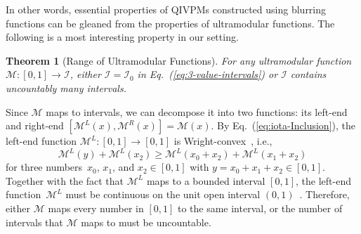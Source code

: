 \documentclass[english,reprint, aps, prl,superscriptaddress, showpacs,
showkeys, longbibliography, amsmath, amssymb, floatfix]{revtex4-1}
\theoremstyle{plain}
\newtheorem{thm}{Theorem}
\theoremstyle{definition}
\newcommand{\ultramodular}{\mathcal{M}}
\newcommand{\ultramodularL}[1][]{\ensuremath{\ultramodular^{L{#1}}}}
\newcommand{\ultramodularR}[1][]{\ensuremath{\ultramodular^{R{#1}}}}
\begin{document}
In other words, essential properties of QIVPMs constructed using
blurring functions can be gleaned from the properties of
ultramodular functions. The following is a most interesting property
in our setting. 

\begin{thm}[Range of Ultramodular Functions]\label{thm:convex-uncountable}For
any ultramodular function~$\ultramodular:\left[0,1\right]\rightarrow\mathscr{I}$,
either $\mathscr{I}=\mathscr{I}_{0}$ in Eq.~(\ref{eq:3-value-intervals}) or
$\mathscr{I}$ contains uncountably many intervals.\end{thm}

Since $\ultramodular$ maps to intervals, we can decompose it into
two functions: its left-end and right-end $\left[\ultramodularL\left(x\right),\ultramodularR\left(x\right)\right]=\ultramodular\left(x\right)$.
By Eq.~(\ref{eq:iota-Inclusion}), the left-end function $\ultramodularL:\left[0,1\right]\rightarrow\left[0,1\right]$
is Wright-convex~\citep{Wright1954,RobertsVarberg1973,PecaricTong1992},
i.e., 
\[
\ultramodularL\left(y\right)+\ultramodularL\left(x_{2}\right)\ge\ultramodularL\left(x_{0}+x_{2}\right)+\ultramodularL\left(x_{1}+x_{2}\right)
\]
for three numbers~$x_{0}$, $x_{1}$, and $x_{2}\in\left[0,1\right]$ with
$y=x_{0}+x_{1}+x_{2}\in\left[0,1\right]$. 
Together with the fact that $\ultramodularL$ maps to a bounded
interval $\left[0,1\right]$, the left-end function~$\ultramodularL$
must be continuous on the unit open interval
$\left(0,1\right)$~\citep{MarinacciMontrucchio2005}.  Therefore,
either $\ultramodular$ maps every number in $\left[0,1\right]$ to the
same interval, or the number of intervals that $\ultramodular$ maps to
must be uncountable.
\end{document}
